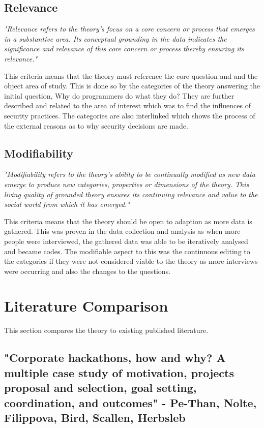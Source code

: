 \subsection{Relevance}

\textit{"Relevance refers to the theory’s focus on a core concern or process that emerges in a substantive area. Its conceptual grounding in the data indicates the significance and relevance of this core concern or process thereby ensuring its relevance." \cite{crit}}
\newline
\par 
This criteria means that the theory must reference the core question and and the object area of study. This is done so by the categories of the theory answering the initial question, Why do programmers do what they do? They are further described and related to the area of interest which was to find the influences of security practices. The categories are also interlinked which shows the process of the external reasons as to why security decisions are made. 

\subsection{Modifiability}

\textit{"Modifiability refers to the theory’s ability to be continually modified as new data emerge to produce new categories, properties or dimensions of the theory. This living quality of grounded theory ensures its continuing relevance and value to the social world from which it has emerged."\cite{crit}}
\newline
\par 
This criteria means that the theory should be open to adaption as more data is gathered. This was proven in the data collection and analysis as when more people were interviewed, the gathered data was able to be iteratively analysed and became codes. The modifiable aspect to this was the continuous editing to the categories if they were not considered viable to the theory as more interviews were occurring and also the changes to the questions. 

\section{Literature Comparison}

This section compares the theory to existing published literature. 

\subsection{"Corporate hackathons, how and why? A multiple case study of motivation, projects proposal and selection, goal setting, coordination, and outcomes" - Pe-Than,  Nolte, Filippova, Bird, Scallen, Herbsleb }

